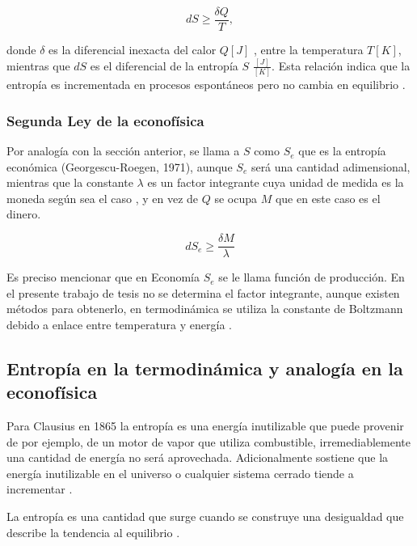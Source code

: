 \begin{equation}
dS \geqslant \frac{\delta Q}{T},
\end{equation}

donde $\delta$ es la diferencial inexacta del calor $Q [J]$ , entre la temperatura $T [K]$, mientras que $dS$ es el diferencial de la entropía $S$ $\frac{[J]}{[K]}$. Esta relación indica que la entropía es incrementada en procesos espontáneos pero no cambia en equilibrio \citep[][pagina 340]{keszei2011chemical}. 

\subsubsection{Segunda Ley de la econofísica} 

Por analogía con la sección anterior, se llama a $S$ como $S_e$ que es la entropía económica (Georgescu-Roegen, 1971), aunque $S_e$ será una cantidad adimensional, mientras que la constante $\lambda$ es un factor integrante cuya unidad de medida es la moneda según sea el caso \citep[][pagina 166]{richmond} , y en vez de $Q$ se ocupa $M$ que en este caso es el dinero. 

\begin{equation}
dS_e \geqslant \frac{\delta M}{\lambda}
\end{equation}

Es preciso mencionar que en Economía $S_e$ se le llama función de producción. En el presente trabajo de tesis no se determina el factor integrante, aunque existen métodos para obtenerlo, en termodinámica se utiliza la constante de Boltzmann debido a enlace entre temperatura y energía \citep[][pagina 166]{richmond}. 

\subsection{Entropía en la termodinámica y analogía en la econof\'isica} 

Para Clausius en 1865 la entropía es una energía inutilizable que puede provenir de por ejemplo, de un motor de vapor que utiliza combustible, irremediablemente una cantidad de energía no será aprovechada. Adicionalmente sostiene que la energía inutilizable en el universo o cualquier sistema cerrado tiende a incrementar \citep[][pagina 21]{cottrell_classical_2009}. 

La entropía es una cantidad que surge cuando se construye una desigualdad que describe la tendencia al equilibrio  \citep[][pagina 70]{keszei2011chemical}. 

